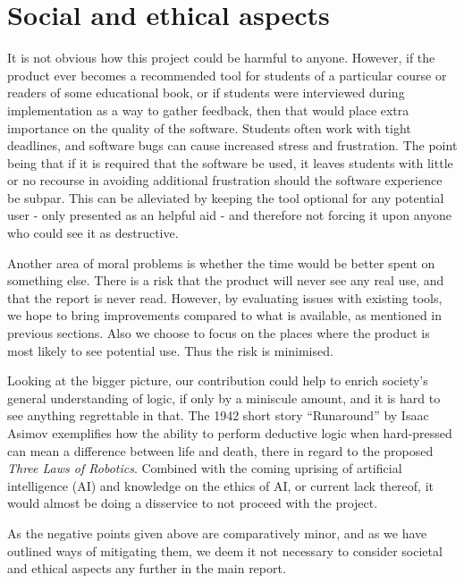 
\section{Social and ethical aspects}

It is not obvious how this project could be harmful to anyone. However, if the product ever becomes a recommended tool for students of a particular course or readers of some educational book, or if students were interviewed during implementation as a way to gather feedback, then that would place extra importance on the quality of the software. Students often work with tight deadlines, and software bugs can cause increased stress and frustration. The point being that if it is required that the software be used, it leaves students with little or no recourse in avoiding additional frustration should the software experience be subpar. This can be alleviated by keeping the tool optional for any potential user - only presented as an helpful aid - and therefore not forcing it upon anyone who could see it as destructive.

Another area of moral problems is whether the time would be better spent on
something else. There is a risk that the product will never see any real use, and that the report is never read. However, by evaluating issues with existing tools, we hope to bring improvements compared to what is available, as mentioned in previous sections. Also we choose to focus on the places where the product is most likely to see potential use. Thus the risk is minimised.

Looking at the bigger picture, our contribution could help to enrich society's general understanding of logic, if only by a miniscule amount, and it is hard to see anything regrettable in that. The 1942 short story ``Runaround'' by Isaac Asimov \autocite{asimov50} exemplifies how the ability to perform deductive logic when hard-pressed can mean a difference between life and
death, there in regard to the proposed \emph{Three Laws of Robotics}. Combined
with the coming uprising of artificial intelligence (AI) and knowledge on the
ethics of AI, or current lack thereof, it would almost be doing a disservice to
not proceed with the project.

As the negative points given above are comparatively minor, and as we have outlined ways of mitigating them, we deem it not necessary to consider societal and ethical aspects any further in the main report.
